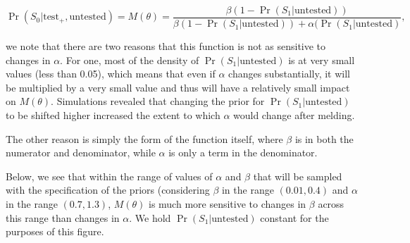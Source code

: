 \documentclass[12pt,twoside]{smiththesis}
\begin{document}
\[\Pr(S_0|\text{test}_+, \text{untested}) = M(\theta)  = \dfrac{\beta (1- \Pr(S_1|\text{untested}))}{\beta(1- \Pr(S_1|\text{untested})) + \alpha(\Pr(S_1|\text{untested})},\]

we note that there are two reasons that this function is not as sensitive to changes in \(\alpha\). For one, most of the density of \(\Pr(S_1|\text{untested})\) is at very small values (less than 0.05), which means that even if \(\alpha\) changes substantially, it will be multiplied by a very small value and thus will have a relatively small impact on \(M(\theta)\). Simulations revealed that changing the prior for \(\Pr(S_1|\text{untested})\) to be shifted higher increased the extent to which \(\alpha\) would change after melding.

The other reason is simply the form of the function itself, where \(\beta\) is in both the numerator and denominator, while \(\alpha\) is only a term in the denominator.

Below, we see that within the range of values of \(\alpha\) and \(\beta\) that will be sampled with the specification of the priors (considering \(\beta\) in the range \((0.01,0.4)\) and \(\alpha\) in the range \((0.7,1.3)\), \(M(\theta)\) is much more sensitive to changes in \(\beta\) across this range than changes in \(\alpha\). We hold \(\Pr(S_1|\text{untested})\) constant for the purposes of this figure.
\end{document}

